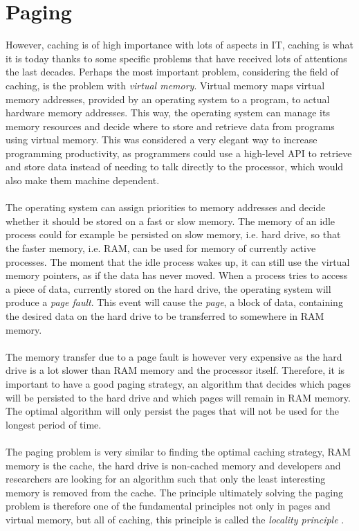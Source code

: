 \documentclass[pdftex,a4paper,12pt,twoside]{report}
\begin{document}
\section{Paging}
However, caching is of high importance with lots of aspects in IT, caching is what it is today thanks to some specific problems that have received lots of attentions the last decades. Perhaps the most important problem, considering the field of caching, is the problem with \emph{virtual memory}. Virtual memory maps virtual memory addresses, provided by an operating system to a program, to actual hardware memory addresses. This way, the operating system can manage its memory resources and decide where to store and retrieve data from programs using virtual memory. This was considered a very elegant way to increase programming productivity, as programmers could use a high-level API to retrieve and store data instead of needing to talk directly to the processor, which would also make them machine dependent.
\\\\
The operating system can assign priorities to memory addresses and decide whether it should be stored on a fast or slow memory. The memory of an idle process could for example be persisted on slow memory, i.e. hard drive, so that the faster memory, i.e. RAM, can be used for memory of currently active processes. The moment that the idle process wakes up, it can still use the virtual memory pointers, as if the data has never moved. When a process tries to access a piece of data, currently stored on the hard drive, the operating system will produce a \emph{page fault}. This event will cause the \emph{page}, a block of data, containing the desired data on the hard drive to be transferred to somewhere in RAM memory.
\\\\
The memory transfer due to a page fault is however very expensive as the hard drive is a lot slower than RAM memory and the processor itself. Therefore, it is important to have a good paging strategy, an algorithm that decides which pages will be persisted to the hard drive and which pages will remain in RAM memory. The optimal algorithm will only persist the pages that will not be used for the longest period of time.
\\\\
The paging problem is very similar to finding the optimal caching strategy, RAM memory is the cache, the hard drive is non-cached memory and developers and researchers are looking for an algorithm such that only the least interesting memory is removed from the cache. The principle ultimately solving the paging problem is therefore one of the fundamental principles not only in pages and virtual memory, but all of caching, this principle is called the \emph{locality principle} \citep{denning1970virtual}.
\\\\
\end{document}
